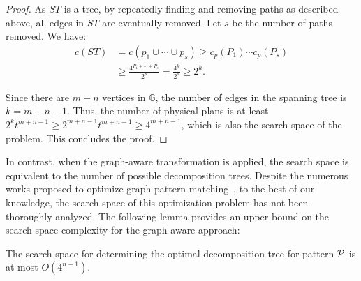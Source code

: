 {\begin{proof}
    As $ST$ is a tree, by repeatedly finding and removing paths as described above, all edges in $ST$ are eventually removed. Let $s$ be the number of paths removed. We have:
    \begin{equation*}
    \begin{split}
        c(ST) & = c(p_1 \cup \cdots \cup p_s) \geq c_p(P_1) \cdots c_p(P_s) \\
        & \geq \frac{4^{P_1 + \cdots + P_s}}{2^s} = \frac{4^{k}}{2^s} \geq 2^{k}.
    \end{split}
    \end{equation*}

    Since there are $m + n$ vertices in $\mathbb{G}$, the number of edges in the spanning tree is $k = m + n - 1$. Thus, the number of physical plans is at least $2^{k}t^{m+n-1} \geq 2^{m+n-1}t^{m+n-1} \geq 4^{m+n-1}$, which is also the search space of the problem. This concludes the proof.
\end{proof}
}

In contrast, when the graph-aware transformation is applied, the search space is equivalent to the number of possible decomposition trees. Despite the numerous works proposed to optimize graph pattern matching~\cite{huge,GLogS,mhedhbi2019optimizing}, to the best of our knowledge, the search space of this optimization problem has not been thoroughly analyzed. The following lemma provides an upper bound on the search space complexity for the graph-aware approach:

\begin{lemma}
\label{lem:complexity-of-graph-aware}
The search space for determining the optimal decomposition tree for pattern $\mathcal{P}$ is at most $O(4^{n-1})$.
\end{lemma}


